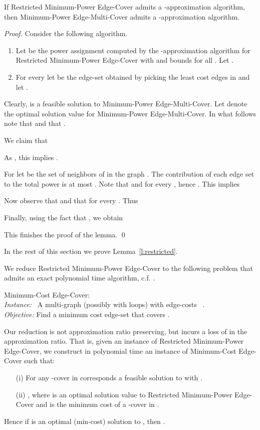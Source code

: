 \documentclass{llncs}
\begin{document}
\begin{lemma} \label{l:alpha}
If {\sf Restricted Minimum-Power Edge-Cover} admits a -ap\-pro\-ximation algorithm,
then {\sf Minimum-Power Edge-Multi-Cover} admits a -approxima\-tion algorithm.
\end{lemma}
\begin{proof}
Consider the following algorithm. 
\begin{enumerate}
\item 
Let  be the power assignment computed by the 
-approximation algorithm for {\sf Restricted Minimum-Power Edge-Cover}  
with  and bounds  for all . 
Let .
\item 
For every  let  be the edge-set obtained by picking 
the least cost  edges in  and let 
. 
\end{enumerate}
Clearly,  is a feasible solution to {\sf Minimum-Power Edge-Multi-Cover}.
Let  denote the optimal solution value for {\sf Minimum-Power Edge-Multi-Cover}.
In what follows note that  and that 
.

We claim that 
 
As , this implies  
.

For  let  be the set of neighbors of  in the graph . 
The contribution of each edge set  to the total power is at most 
.
Note that  and  for every ,
hence .
This implies 

Now observe that 
 and that 
for every .
Thus 

Finally, using the fact that , we obtain

This finishes the proof of the lemma. \qed
\end{proof}

In the rest of this section we prove Lemma~\ref{l:restricted}.

We reduce {\sf Restricted Minimum-Power Edge-Cover} to the following problem that admits an exact polynomial time algorithm, c.f. \cite{Sch}.

\vspace{0.2cm}

\noindent
{\sf Minimum-Cost Edge-Cover}: \\
{\em Instance:} \ A multi-graph (possibly with loops)  with edge-costs 
\hphantom{\em Instance: }~. \\
{\em Objective:} Find a minimum cost edge-set  that covers . 

\vspace{0.2cm}

Our reduction is not approximation ratio preserving, but incurs a loss of  in the appro\-xi\-mation ratio.
That is, given an instance  of {\sf Restricted Minimum-Power Edge-Cover}, 
we construct in polynomial time an instance  of {\sf Minimum-Cost Edge-Cover} such that:
\begin{itemize}
\item[(i)] 
For any -cover  in  corresponds a feasible 
solution  to  with .
\item[(ii)] 
, where  is an optimal solution value 
to {\sf Restricted Minimum-Power Edge-Cover} and
 is the minimum cost of a -cover in .
\end{itemize}
Hence if  is an optimal (min-cost) solution to , then 
.
\end{document}
